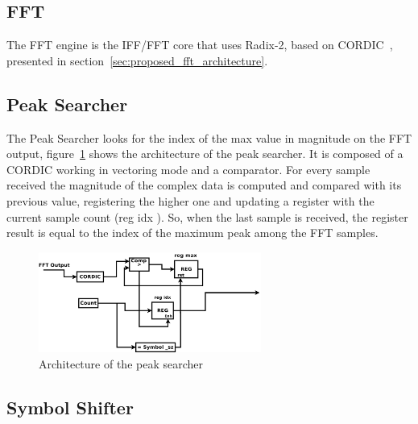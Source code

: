 \subsection{FFT}
The FFT engine is the IFF/FFT core that uses Radix-2,  based on CORDIC~\cite{voider1959}, presented in section~\ref{sec:proposed_fft_architecture}.

\subsection{Peak Searcher}


The Peak Searcher looks for the index of the max value in magnitude on the FFT output, figure~\ref{fig:arq_peak_searcher} shows the architecture of the peak searcher. It is composed of a CORDIC working in vectoring mode and a comparator. 
For every sample received the magnitude of the complex data is computed and compared with its 
previous value, registering the higher one and updating a register with the current sample count (reg idx ). So, when the 
last sample is received, the register  result is equal to the index of the maximum 
peak among the FFT samples. 

\begin{figure}[!hbt]
  \centering
    \includegraphics[width=0.65\textwidth]
      {./figures/peak_searcher}
  \caption{Architecture of the peak searcher}
  \label{fig:arq_peak_searcher}
\end{figure}

\subsection{Symbol Shifter}

